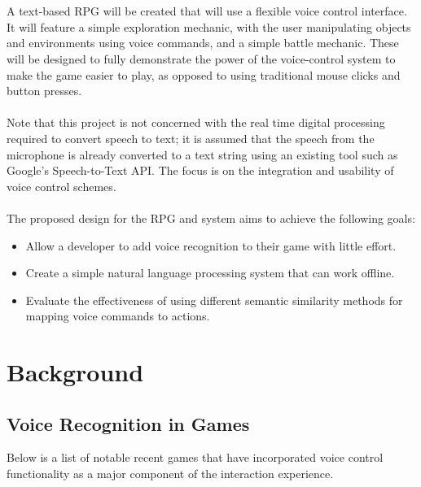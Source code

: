 \documentclass[11pt]{article}
\begin{document}
\\
\\
A text-based RPG will be created that will use a flexible voice control interface. It will feature a simple exploration mechanic, with the user manipulating objects and environments using voice commands, and a simple battle mechanic. These will be designed to fully demonstrate the power of the voice-control system to make the game easier to play, as opposed to using traditional mouse clicks and button presses.
\\
\\
Note that this project is not concerned with the real time digital processing required to convert speech to text; it is assumed that the speech from the microphone is already converted to a text string using an existing tool such as Google's Speech-to-Text API. The focus is on the integration and usability of voice control schemes.
\\
\\
The proposed design for the RPG and system aims to achieve the following goals:
\begin{itemize}
\item Allow a developer to add voice recognition to their game with little effort.
\item Create a simple natural language processing system that can work offline.
\item Evaluate the effectiveness of using different semantic similarity methods for mapping voice commands to actions.
\end{itemize}

\newpage
\section{Background}

\subsection{Voice Recognition in Games}
Below is a list of notable recent games that have incorporated voice control functionality as a major component of the interaction experience.
\end{document}
